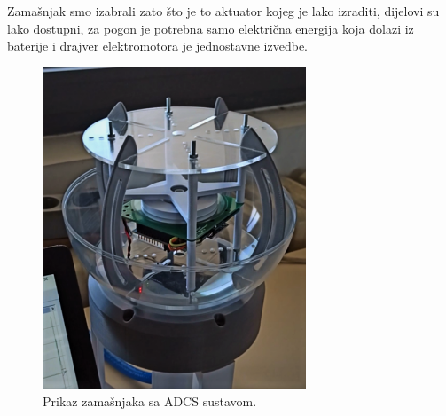 \documentclass[times, utf8, diplomski, numeric]{templates/template}
\begin{document}
{{{            Zamašnjak smo izabrali zato što je to aktuator kojeg je lako izraditi, dijelovi su lako dostupni, za pogon je potrebna samo električna energija koja dolazi iz baterije i drajver elektromotora je jednostavne izvedbe. 
            \begin{figure}[htb]
            \centering
            \includegraphics[width=0.7\textwidth]{images/zamasnjak.png}
            \caption{Prikaz zamašnjaka sa ADCS sustavom.}
            \label{fig:zamasnjak}
            \end{figure}
        }
    }
}
\end{document}
